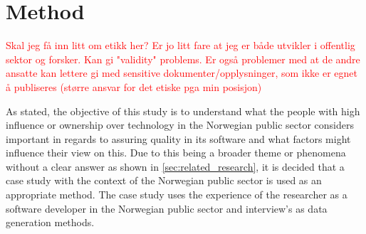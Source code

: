 \chapter{Method}

\textcolor{red}{Skal jeg få inn litt om etikk her? Er jo litt fare at jeg er både utvikler i offentlig sektor og forsker. Kan gi "validity" problems. Er også problemer med at de andre ansatte kan lettere gi med sensitive dokumenter/opplysninger, som ikke er egnet å publiseres (større ansvar for det etiske pga min posisjon)}



As stated, the objective of this study is to understand what the people with high influence or ownership over technology in the Norwegian public sector considers important in regards to assuring quality in its software and what factors might influence their view on this. Due to this being a broader theme or phenomena \cite{bjo_2022} without a clear answer as shown in \autoref{sec:related_research}, it is decided that a case study with the context of the Norwegian public sector is used as an appropriate method. The case study uses the experience of the researcher as a software developer in the Norwegian public sector and interview's as data generation methods.

